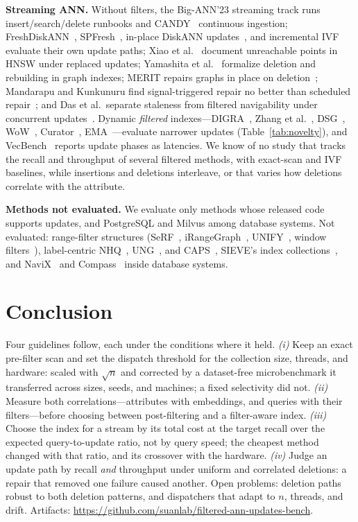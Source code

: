 \documentclass[conference]{IEEEtran}
\begin{document}
\textbf{Streaming ANN.} Without filters, the Big-ANN'23 streaming track runs insert/search/delete runbooks and CANDY~\cite{candy} continuous ingestion; FreshDiskANN~\cite{freshdiskann}, SPFresh~\cite{spfresh}, in-place DiskANN updates~\cite{ipdiskann}, and incremental IVF~\cite{adaivf} evaluate their own update paths; Xiao et al.~\cite{xiao2024} document unreachable points in HNSW under replaced updates; Yamashita et al.~\cite{yamashita2025} formalize deletion and rebuilding in graph indexes; MERIT repairs graphs in place on deletion~\cite{merit}; Mandarapu and Kunkunuru find signal-triggered repair no better than scheduled repair~\cite{mandarapu2026repair}; and Das et al.\ separate staleness from filtered navigability under concurrent updates~\cite{das2026}. Dynamic \emph{filtered} indexes---DIGRA~\cite{digra}, Zhang et al.~\cite{zhang2025dyn}, DSG~\cite{dsg}, WoW~\cite{wow}, Curator~\cite{curator}, EMA~\cite{ema}---evaluate narrower updates (Table~\ref{tab:novelty}), and VecBench~\cite{vecbench} reports update phases as latencies. We know of no study that tracks the recall and throughput of several filtered methods, with exact-scan and IVF baselines, while insertions and deletions interleave, or that varies how deletions correlate with the attribute.

\textbf{Methods not evaluated.} We evaluate only methods whose released code supports updates, and PostgreSQL and Milvus among database systems. Not evaluated: range-filter structures (SeRF~\cite{serf}, iRangeGraph~\cite{irange}, UNIFY~\cite{unify}, window filters~\cite{window}), label-centric NHQ~\cite{nhq}, UNG~\cite{ung}, and CAPS~\cite{caps}, SIEVE's index collections~\cite{sieve}, and NaviX~\cite{navix} and Compass~\cite{compass} inside database systems.

\section{Conclusion}\label{sec:conclusion}
Four guidelines follow, each under the conditions where it held. \emph{(i)} Keep an exact pre-filter scan and set the dispatch threshold for the collection size, threads, and hardware: scaled with $\sqrt n$ and corrected by a dataset-free microbenchmark it transferred across sizes, seeds, and machines; a fixed selectivity did not. \emph{(ii)} Measure both correlations---attributes with embeddings, and queries with their filters---before choosing between post-filtering and a filter-aware index. \emph{(iii)} Choose the index for a stream by its total cost at the target recall over the expected query-to-update ratio, not by query speed; the cheapest method changed with that ratio, and its crossover with the hardware. \emph{(iv)} Judge an update path by recall \emph{and} throughput under uniform and correlated deletions: a repair that removed one failure caused another. Open problems: deletion paths robust to both deletion patterns, and dispatchers that adapt to $n$, threads, and drift. Artifacts: \url{https://github.com/suanlab/filtered-ann-updates-bench}.
\end{document}

